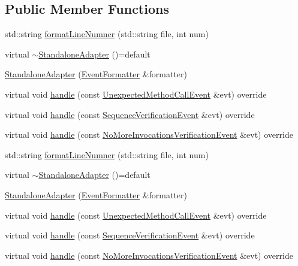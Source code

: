 \subsection*{Public Member Functions}
\begin{DoxyCompactItemize}
\item 
std\+::string \mbox{\hyperlink{structfakeit_1_1StandaloneAdapter_a0d04fda6d7cc203d160b950df47fa284}{format\+Line\+Numner}} (std\+::string file, int num)
\item 
virtual \mbox{\hyperlink{structfakeit_1_1StandaloneAdapter_a04887de33b1051afc2fa0aa12d5d1969}{$\sim$\+Standalone\+Adapter}} ()=default
\item 
\mbox{\hyperlink{structfakeit_1_1StandaloneAdapter_a3a836d2ff78bb811a96c4cc3228f5f37}{Standalone\+Adapter}} (\mbox{\hyperlink{structfakeit_1_1EventFormatter}{Event\+Formatter}} \&formatter)
\item 
virtual void \mbox{\hyperlink{structfakeit_1_1StandaloneAdapter_aad5bb15b86423092172ba7ee0df7a7f8}{handle}} (const \mbox{\hyperlink{structfakeit_1_1UnexpectedMethodCallEvent}{Unexpected\+Method\+Call\+Event}} \&evt) override
\item 
virtual void \mbox{\hyperlink{structfakeit_1_1StandaloneAdapter_a18270ea7ca75fa8fe690faac7969a808}{handle}} (const \mbox{\hyperlink{structfakeit_1_1SequenceVerificationEvent}{Sequence\+Verification\+Event}} \&evt) override
\item 
virtual void \mbox{\hyperlink{structfakeit_1_1StandaloneAdapter_aa8eee53eed1912200af8681e94587bef}{handle}} (const \mbox{\hyperlink{structfakeit_1_1NoMoreInvocationsVerificationEvent}{No\+More\+Invocations\+Verification\+Event}} \&evt) override
\item 
std\+::string \mbox{\hyperlink{structfakeit_1_1StandaloneAdapter_a0d04fda6d7cc203d160b950df47fa284}{format\+Line\+Numner}} (std\+::string file, int num)
\item 
virtual \mbox{\hyperlink{structfakeit_1_1StandaloneAdapter_a04887de33b1051afc2fa0aa12d5d1969}{$\sim$\+Standalone\+Adapter}} ()=default
\item 
\mbox{\hyperlink{structfakeit_1_1StandaloneAdapter_a3a836d2ff78bb811a96c4cc3228f5f37}{Standalone\+Adapter}} (\mbox{\hyperlink{structfakeit_1_1EventFormatter}{Event\+Formatter}} \&formatter)
\item 
virtual void \mbox{\hyperlink{structfakeit_1_1StandaloneAdapter_aad5bb15b86423092172ba7ee0df7a7f8}{handle}} (const \mbox{\hyperlink{structfakeit_1_1UnexpectedMethodCallEvent}{Unexpected\+Method\+Call\+Event}} \&evt) override
\item 
virtual void \mbox{\hyperlink{structfakeit_1_1StandaloneAdapter_a18270ea7ca75fa8fe690faac7969a808}{handle}} (const \mbox{\hyperlink{structfakeit_1_1SequenceVerificationEvent}{Sequence\+Verification\+Event}} \&evt) override
\item 
virtual void \mbox{\hyperlink{structfakeit_1_1StandaloneAdapter_aa8eee53eed1912200af8681e94587bef}{handle}} (const \mbox{\hyperlink{structfakeit_1_1NoMoreInvocationsVerificationEvent}{No\+More\+Invocations\+Verification\+Event}} \&evt) override
\end{DoxyCompactItemize}


